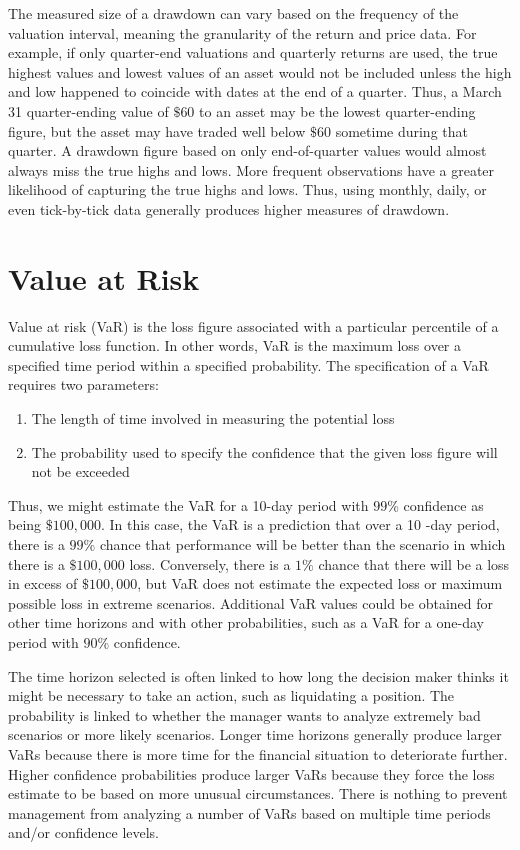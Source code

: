 \documentclass[11pt]{article}
\begin{document}
The measured size of a drawdown can vary based on the frequency of the valuation interval, meaning the granularity of the return and price data. For example, if only quarter-end valuations and quarterly returns are used, the true highest values and lowest values of an asset would not be included unless the high and low happened to coincide with dates at the end of a quarter. Thus, a March 31 quarter-ending value of $\$ 60$ to an asset may be the lowest quarter-ending figure, but the asset may have traded well below $\$ 60$ sometime during that quarter. A drawdown figure based on only end-of-quarter values would almost always miss the true highs and lows. More frequent observations have a greater likelihood of capturing the true highs and lows. Thus, using monthly, daily, or even tick-by-tick data generally produces higher measures of drawdown.

\section*{Value at Risk}
Value at risk (VaR) is the loss figure associated with a particular percentile of a cumulative loss function. In other words, VaR is the maximum loss over a specified time period within a specified probability. The specification of a VaR requires two parameters:

\begin{enumerate}
  \item The length of time involved in measuring the potential loss

  \item The probability used to specify the confidence that the given loss figure will not be exceeded

\end{enumerate}

Thus, we might estimate the VaR for a 10-day period with $99 \%$ confidence as being $\$ 100,000$. In this case, the VaR is a prediction that over a 10 -day period, there is a $99 \%$ chance that performance will be better than the scenario in which there is a $\$ 100,000$ loss. Conversely, there is a $1 \%$ chance that there will be a loss in excess of $\$ 100,000$, but VaR does not estimate the expected loss or maximum possible loss in extreme scenarios. Additional VaR values could be obtained for other time horizons and with other probabilities, such as a VaR for a one-day period with $90 \%$ confidence.

The time horizon selected is often linked to how long the decision maker thinks it might be necessary to take an action, such as liquidating a position. The probability is linked to whether the manager wants to analyze extremely bad scenarios or more likely scenarios. Longer time horizons generally produce larger VaRs because there is more time for the financial situation to deteriorate further. Higher confidence probabilities produce larger VaRs because they force the loss estimate to be based on more unusual circumstances. There is nothing to prevent management from analyzing a number of VaRs based on multiple time periods and/or confidence levels.
\end{document}
